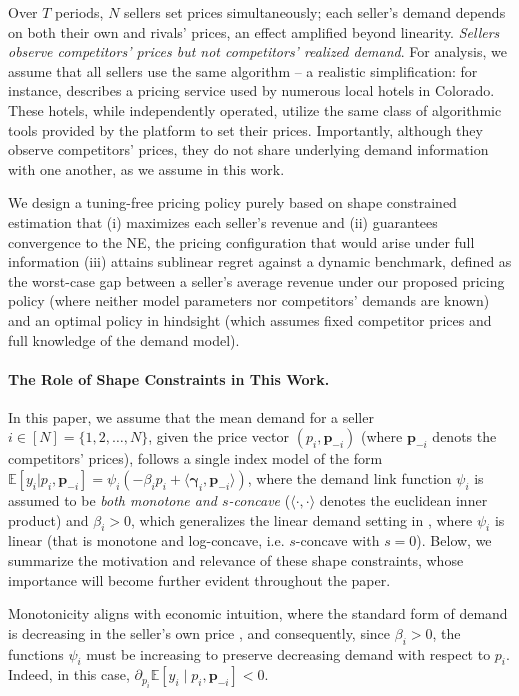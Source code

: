 \documentclass{article} %
\begin{document}
Over $T$ periods, $N$ sellers set prices simultaneously; each seller’s demand depends on both their own and rivals’ prices, an effect amplified beyond linearity. \emph{Sellers observe competitors’ prices but not competitors’ realized demand}. For analysis, we assume that all sellers use the same algorithm -- a realistic simplification: for instance, \cite{PricingServiceAI2025} describes a pricing service used by numerous local hotels in Colorado. These hotels, while independently operated, utilize the same class of algorithmic tools provided by the platform to set their prices. Importantly, although they observe competitors’ prices, they do not share underlying demand information with one another, as we assume in this work.

We design a tuning-free pricing policy purely based on shape constrained estimation that (i) maximizes each seller’s revenue and (ii) guarantees convergence to the NE, the pricing configuration that would arise under full information (iii) attains sublinear regret against a dynamic benchmark, defined as the worst-case gap between a seller’s average revenue under our proposed pricing policy (where neither model parameters nor competitors' demands are known) and an optimal policy in hindsight (which assumes fixed competitor prices and full knowledge of the demand model).

\paragraph{The Role of Shape Constraints in This Work.} In this paper, we assume that the mean demand for a seller $i\in [N]=\{1,2,\dots, N\}$, given the price vector $(p_i, \mathbf{p}_{-i})$ (where $\mathbf{p}_{-i}$ denots the competitors' prices), follows a single index model of the form $\mathbb{E}[y_i|p_i, \mathbf{p}_{-i}]=\psi_i(-\beta_i p_i + \langle \boldsymbol{\gamma}_i,\mathbf{p}_{-i}\rangle)$, where the demand link function $\psi_i$ is assumed to be \emph{both monotone and $s$-concave} ($\langle \cdot, \cdot \rangle$ denotes the euclidean inner product) and $\beta_i>0$, which generalizes the linear demand setting in \cite{li2024lego}, where $\psi_i$ is linear (that is monotone and log-concave, i.e. $s$-concave with $s=0$). Below, we summarize the motivation and relevance of these shape constraints, whose importance will become further evident throughout the paper.

Monotonicity aligns with economic intuition, where the standard form of demand is decreasing in the seller’s own price \citep{li2024lego, friesz2012competitive, kirman1975learning}, and consequently, since $\beta_i>0$, the functions $\psi_i$ must be increasing to preserve decreasing demand with respect to $p_i$. Indeed, in this case, $\partial_{p_i} \mathbb{E}[y_i \mid p_i, \mathbf{p}_{-i}]<0$.
\end{document}
